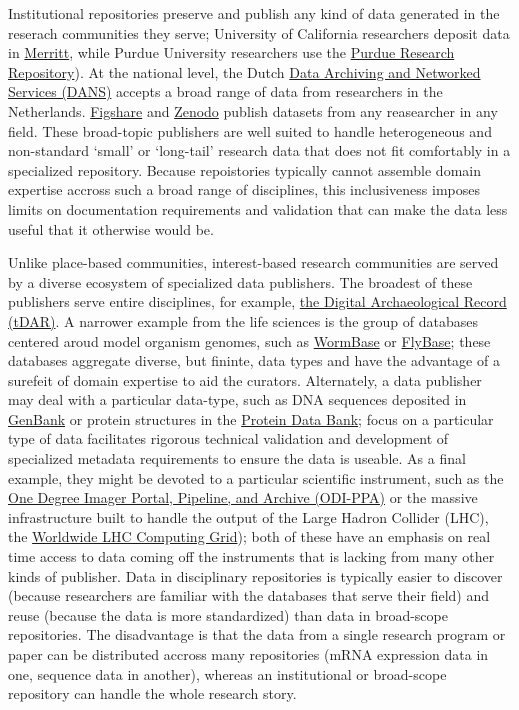\documentclass[10pt,a4paper,twocolumn]{article}
\begin{document}
Institutional repositories preserve and publish any kind of data generated in the reserach communities they serve; University of California researchers deposit data in \href{https://merritt.cdlib.org/}{Merritt}, while Purdue University researchers use the \href{https://purr.purdue.edu/}{Purdue Research Repository}).
At the national level, the Dutch \href{http://www.dans.knaw.nl/en}{Data Archiving and Networked Services (DANS)} accepts a broad range of data from researchers in the Netherlands.
\href{http://figshare.com/}{Figshare} and \href{http://zenodo.org/}{Zenodo} publish datasets from any reasearcher in any field.
These broad-topic publishers are well suited to handle heterogeneous and non-standard `small' or `long-tail' research data that does not fit comfortably in a specialized repository.
Because repoistories typically cannot assemble domain expertise accross such a broad range of disciplines, this inclusiveness imposes limits on documentation requirements and validation that can make the data less useful that it otherwise would be.

Unlike place-based communities, interest-based research communities are served by a diverse ecosystem of specialized data publishers.
The broadest of these publishers serve entire disciplines, for example, \href{http://www.tdar.org/}{the Digital Archaeological Record (tDAR)}.
A narrower example from the life sciences is the group of databases centered aroud model organism genomes, such as \href{http://www.wormbase.org/}{WormBase}\cite{harris_wormbase_2014} or \href{http://flybase.org/}{FlyBase}\cite{pierre_flybase_2014}; these databases aggregate diverse, but fininte, data types and have the advantage of a surefeit of domain expertise to aid the curators.
Alternately, a data publisher may deal with a particular data-type, such as DNA sequences deposited in \href{http://www.ncbi.nlm.nih.gov/genbank/}{GenBank}\cite{benson_genbank_2013} or protein structures in the \href{http://www.rcsb.org/}{Protein Data Bank}\cite{berman_protein_2000}; focus on a particular type of data facilitates rigorous technical validation and development of specialized metadata requirements to ensure the data is useable.
As a final example, they might be devoted to a particular scientific instrument, such as the \href{http://portal.odi.iu.edu}{One Degree Imager Portal, Pipeline, and Archive (ODI-PPA)} or the massive infrastructure built to handle the output of the Large Hadron Collider (LHC), the \href{http://wlcg.web.cern.ch/}{Worldwide LHC Computing Grid}); both of these have an emphasis on real time access to data coming off the instruments that is lacking from many other kinds of publisher.
Data in disciplinary repositories is typically easier to discover (because researchers are familiar with the databases that serve 
their field) and reuse (because the data is more standardized) than data in broad-scope repositories.
The disadvantage is that the data from a single research program or paper can be distributed accross many repositories (mRNA expression data in one, sequence data in another), whereas an institutional or broad-scope repository can handle the whole research story.
\end{document}

